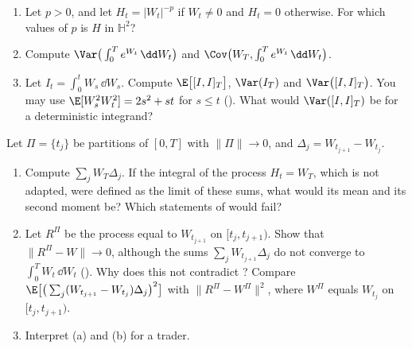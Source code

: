 
\begin{exercise}\label{ex:ito-isometry}
\easy
\begin{enumerate}[label=(\alph*)]
  \item Let $p>0$, and let $H_t=|W_t|^{-p}$ if $W_t\neq0$ and $H_t=0$ otherwise. For which
    values of $p$ is $H$ in $\mathbb H^2$?
  \item Compute $\Var\big(\int_0^Te^{W_t}\,\dd W_t\big)$ and
    $\Cov\big(W_T,\int_0^Te^{W_t}\,\dd W_t\big)$.
  \item Let $I_t=\int_0^tW_s\,\dd W_s$. Compute $\E\big[[I,I]_T\big]$, $\Var(I_T)$ and
    $\Var\big([I,I]_T\big)$. You may use $\E[W_s^2W_t^2]=2s^2+st$ for $s\le t$
    (). What would $\Var([I,I]_T)$ be for a deterministic integrand?
\end{enumerate}
\end{exercise}

\begin{exercise}\label{ex:ito-adapted}
\easy Let $\Pi=\{t_j\}$ be partitions of $[0,T]$ with $\|\Pi\|\to0$, and
$\Delta_j=W_{t_{j+1}}-W_{t_j}$.
\begin{enumerate}[label=(\alph*)]
  \item Compute $\sum_jW_T\Delta_j$. If the integral of the process $H_t=W_T$, which is not
    adapted, were defined as the limit of these sums, what would its mean and its second
    moment be? Which statements of  would fail?
  \item Let $R^\Pi$ be the process equal to $W_{t_{j+1}}$ on $[t_j,t_{j+1})$. Show that
    $\|R^\Pi-W\|\to0$, although the sums $\sum_jW_{t_{j+1}}\Delta_j$ do not converge to
    $\int_0^TW_t\,\dd W_t$ (). Why does this not contradict
    ? Compare
    $\E\big[\big(\sum_j(W_{t_{j+1}}-W_{t_j})\Delta_j\big)^2\big]$ with $\|R^\Pi-W^\Pi\|^2$, where
    $W^\Pi$ equals $W_{t_j}$ on $[t_j,t_{j+1})$.
  \item Interpret (a) and (b) for a trader.
\end{enumerate}
\end{exercise}


